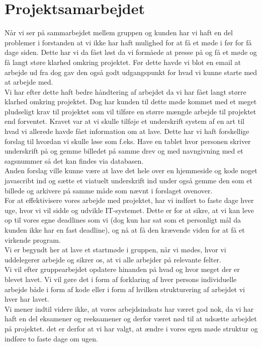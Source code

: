 \documentclass[a4paper]{article}
\begin{document}
\section{Projektsamarbejdet}
Når vi ser på sammarbejdet mellem gruppen og kunden har vi haft en del problemer i forstanden at vi ikke har haft mulighed for at få et møde i før for få dage siden. Dette har vi da fået løst da vi formåede at presse på og få et møde og få langt støre klarhed omkring projektet. Før dette havde vi blot en email at arbejde ud fra dog gav den også godt udgangspunkt for hvad vi kunne starte med at arbejde med.\\
Vi har efter dette haft bedre håndtering af arbejdet da vi har fået langt større klarhed omkring projektet. Dog har kunden til dette møde kommet med et meget pludseligt krav til projektet som vil tilføre en større mængde arbejde til projektet end forventet. Kravet var at vi skulle tilføje et underskrift system af en art til hvad vi allerede havde fået information om at lave. Dette har vi haft forskellige forslag til hvordan vi skulle løse som f.eks. Have en tablet hvor personen skriver underskrift på og gemme billedet på samme drev og med navngivning med et sagsnummer så det kan findes via databasen.\\
Anden forslag ville kunne være at lave det hele over en hjemmeside og kode noget javascribt ind og sætte et viatuelt underskrift ind under også gemme den som et billede og arkivere på samme måde som nævnt i forslaget ovenover.\\
For at effektivisere vores arbejde med projektet, har vi indført to faste dage hver uge, hvor vi vil sidde og udvikle IT-systemet. Dette er for at sikre, at vi kan leve op til vores egne deadlines som vi (dog kun har sat som et personligt mål da kunden ikke har en fast deadline), og nå at få den krævende viden for at få et virkende program.\\
Vi er begyndt her at lave et startmøde i gruppen, når vi mødes, hvor vi uddelegerer arbejde og sikrer os, at vi alle arbejder på relevante felter.\\
Vi vil efter gruppearbejdet opdatere hinanden på hvad og hvor meget der er blevet lavet. Vi vil gøre det i form af forklaring af hver persons individuelle arbejde både i form af kode eller i form af hvilken strukturering af arbejdet vi hver har lavet.\\
Vi mener indtil videre ikke, at vores arbejdsindsats har været god nok, da vi har haft en del eksamener og reeksamener og derfor været nød til at udsætte arbejdet på projektet. det er derfor at vi har valgt, at ændre i vores egen møde struktur og indføre to faste dage om ugen.
\newpage
\end{document}

